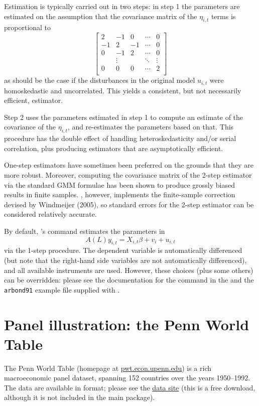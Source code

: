 Estimation is typically carried out in two steps: in step 1 the
parameters are estimated on the assumption that the covariance matrix
of the $\eta_{i,t}$ terms is proportional to
\[
\left[
  \begin{array}{rrrrr}
    2 & -1 & 0 & \cdots & 0 \\
    -1 & 2 & -1 & \cdots & 0 \\
    0 & -1 & 2 & \cdots & 0 \\
    & \vdots & & \ddots & \vdots \\
    0 & 0 & 0 & \cdots & 2 \\
  \end{array}
\right] 
\]
as should be the case if the disturbances in the original model
$u_{i,t}$ were homoskedastic and uncorrelated. This yields a
consistent, but not necessarily efficient, estimator.

Step 2 uses the parameters estimated in step 1 to compute an estimate
of the covariance of the $\eta_{i,t}$, and re-estimates the parameters
based on that. This procedure has the double effect of handling
heteroskedasticity and/or serial correlation, plus producing
estimators that are asymptotically efficient.

One-step estimators have sometimes been preferred on the grounds that
they are more robust.  Moreover, computing the covariance matrix of the
2-step estimator via the standard GMM formulae has been shown to
produce grossly biased results in finite samples. ,
however, implements the finite-sample correction devised by Windmeijer
(2005), so standard errors for the 2-step estimator can be considered
relatively accurate.

By default, 's  command estimates the parameters in
\[
  A(L) y_{i,t} = X_{i,t}\beta + v_i + u_{i,t} 
\]
via the 1-step procedure.  The dependent variable is automatically
differenced (but note that the right-hand side variables are not
automatically differenced), and all available instruments are used.
However, these choices (plus some others) can be overridden: please
see the documentation for the  command in the \GCR{} and
the \texttt{arbond91} example file supplied with .

\section{Panel illustration: the Penn World Table}
\label{PWT}

The Penn World Table (homepage at
\href{http://pwt.econ.upenn.edu/}{pwt.econ.upenn.edu}) is a rich
macroeconomic panel dataset, spanning 152 countries over the years
1950--1992.  The data are available in  format; please see
the 
\href{http://gretl.sourceforge.net/gretl_data.html}{data site} (this
is a free download, although it is not included in the main
 package).

